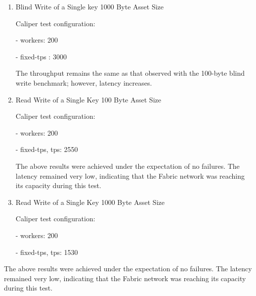 \documentclass[conference]{IEEEtran}
\begin{document}
\begin{enumerate}[itemsep=2ex, parsep=1ex]
\begin{enumerate}[itemsep=2ex, parsep=1ex]
\begin{enumerate}[itemsep=2ex, parsep=1ex]
	      	      	\item Blind Write of a Single key 1000 Byte Asset Size
	      	      	      	      	      	      
	      	      	      Caliper test configuration:
	      	      	      	      	      	      
	      	      	      - workers: 200
	      	      	      	      	      	      
	      	      	      - fixed-tps : 3000
	      	      	      	      	      	      
	      	      	      The throughput remains the same as that observed with the 100-byte
	      	      	      blind write benchmark; however, latency increases.
	      	      	      	      	      	      
	      	      	\item Read Write of a Single Key 100 Byte Asset Size
	      	      	      	      	      	      
	      	      	      Caliper test configuration:
	      	      	      	      	      	      
	      	      	      - workers: 200
	      	      	      	      	      	      
	      	      	      - fixed-tps, tps: 2550
	      	      	      	      	      	      
	      	      	      The above results were achieved under the expectation of no failures.
	      	      	      The latency remained very low, indicating that the Fabric network was
	      	      	      reaching its capacity during this test.
	      	      	      	      	      	      
	      	      	\item Read Write of a Single Key 1000 Byte Asset Size
	      	      	      	      	      	      
	      	      	      Caliper test configuration:
	      	      	      	      	      	      
	      	      	      - workers: 200
	      	      	      	      	      	      
	      	      	      - fixed-tps, tps: 1530
	      	      \end{enumerate}
	      \end{enumerate}
	      	      
	      The above results were achieved under the expectation of no failures. The
	      latency remained very low, indicating that the Fabric network was reaching
	      its capacity during this test.
\end{enumerate}
\end{document}
